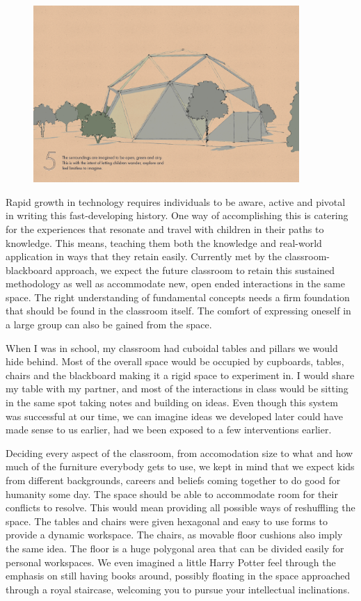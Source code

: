 \documentclass[a4paper,7pt]{article}
\begin{document}
\begin{figure}[h]
  \center
  \includegraphics[width=0.9\textwidth]{discoverdrome_5.png}
\end{figure}

Rapid growth in technology requires individuals to be aware, active and pivotal in writing this fast-developing history. One way of accomplishing this is catering for the experiences that resonate and travel with children in their paths to knowledge. This means, teaching them both the knowledge and real-world application in ways that they retain easily. Currently met by the classroom-blackboard approach, we expect the future classroom to retain this sustained methodology as well as accommodate new, open ended interactions in the same space. The right understanding of fundamental concepts needs a firm foundation that should be found in the classroom itself. The comfort of expressing oneself in a large group can also be gained from the space.  

When I was in school, my classroom had cuboidal tables and pillars we would hide behind. Most of the overall space would be occupied by cupboards, tables, chairs and the blackboard making it a rigid space to experiment in. I would share my table with my partner, and most of the interactions in class would be sitting in the same spot taking notes and building on ideas. Even though this system was successful at our time, we can imagine ideas we developed later could have made sense to us earlier, had we been exposed to a few interventions earlier.

Deciding every aspect of the classroom, from accomodation size to what and how much of the furniture everybody gets to use, we kept in mind that we expect  kids from different backgrounds, careers and beliefs coming together to do good for humanity some day. The space should be able to accommodate room for their conflicts to resolve. This would mean providing all possible ways of reshuffling the space. The tables and chairs were given hexagonal and easy to use forms to provide a dynamic workspace. The chairs, as movable floor cushions also imply the same idea. The floor is a huge polygonal area that can be divided easily for personal workspaces. We even imagined a little Harry Potter feel through the emphasis on still having books around, possibly floating in the space approached through a royal staircase, welcoming you to pursue your intellectual inclinations.
\end{document}

